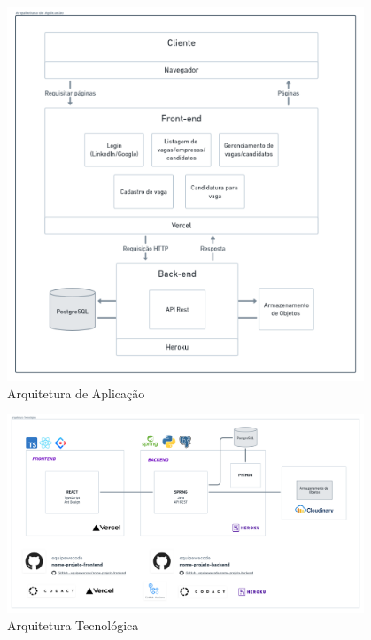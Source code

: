 \begin{figure}[htb]
	\centering
	\caption{\label{fig_arq_app}Arquitetura de Aplicação}
	\includegraphics[width=0.95\textwidth]{../Figuras/arq-proj-arq-app.png}
\end{figure}

\begin{figure}[htb]
	\centering
	\caption{\label{fig_arq_tec}Arquitetura Tecnológica}
	\includegraphics[width=0.95\textwidth]{../Figuras/arq-proj-arq-tec.png}
\end{figure}

